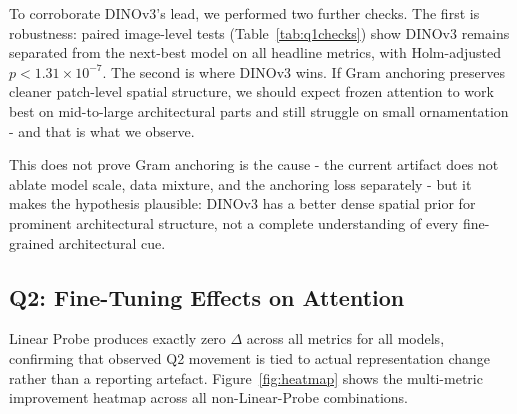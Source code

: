 \documentclass{article}
\newlength{\reportcolwidth}
\begin{document}
To corroborate DINOv3's lead, we performed two further checks. The first is
robustness: paired image-level tests (Table~\ref{tab:q1checks}) show DINOv3
remains separated from the next-best model on all headline metrics, with
Holm-adjusted $p\!<\!1.31\!\times\!10^{-7}$. The second is where DINOv3 wins.
If Gram anchoring preserves cleaner patch-level spatial structure, we should
expect frozen attention to work best on mid-to-large architectural parts and
still struggle on small ornamentation - and that is what we observe.

\begin{table}[h]
\centering
\caption{Q1 robustness and spatial checks for DINOv3.}
\label{tab:q1checks}
\end{table}

This does not prove Gram anchoring is the cause - the current artifact does
not ablate model scale, data mixture, and the anchoring loss separately - but
it makes the hypothesis plausible: DINOv3 has a better dense spatial prior for
prominent architectural structure, not a complete understanding of every
fine-grained architectural cue.

\subsection{Q2: Fine-Tuning Effects on Attention}

Linear Probe produces exactly zero $\Delta$ across all metrics for all models,
confirming that observed Q2 movement is tied to actual representation change
rather than a reporting artefact. Figure~\ref{fig:heatmap} shows the
multi-metric improvement heatmap across all non-Linear-Probe combinations.
\end{document}
